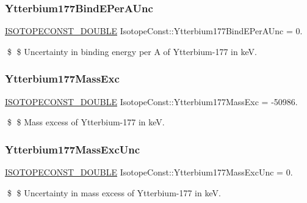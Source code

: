 \subsubsection{\texorpdfstring{Ytterbium177\+Bind\+E\+Per\+A\+Unc}{Ytterbium177BindEPerAUnc}}
{\footnotesize\ttfamily \mbox{\hyperlink{group___isotope_const-_macros_ga8f45a7272ce02c0b4c65c44636ed719a}{I\+S\+O\+T\+O\+P\+E\+C\+O\+N\+S\+T\+\_\+\+D\+O\+U\+B\+LE}} Isotope\+Const\+::\+Ytterbium177\+Bind\+E\+Per\+A\+Unc = 0.}

\$ \$ Uncertainty in binding energy per A of Ytterbium-\/177 in keV. \mbox{\label{group___isotope_const-_ytterbium-_yb177_ga6a1136306d6475c893e20b23e90b9ba8}} 
\subsubsection{\texorpdfstring{Ytterbium177\+Mass\+Exc}{Ytterbium177MassExc}}
{\footnotesize\ttfamily \mbox{\hyperlink{group___isotope_const-_macros_ga8f45a7272ce02c0b4c65c44636ed719a}{I\+S\+O\+T\+O\+P\+E\+C\+O\+N\+S\+T\+\_\+\+D\+O\+U\+B\+LE}} Isotope\+Const\+::\+Ytterbium177\+Mass\+Exc = -\/50986.}

\$ \$ Mass excess of Ytterbium-\/177 in keV. \mbox{\label{group___isotope_const-_ytterbium-_yb177_gaed6ceb0d0d1f862b0f3e260b2764f9fb}} 
\subsubsection{\texorpdfstring{Ytterbium177\+Mass\+Exc\+Unc}{Ytterbium177MassExcUnc}}
{\footnotesize\ttfamily \mbox{\hyperlink{group___isotope_const-_macros_ga8f45a7272ce02c0b4c65c44636ed719a}{I\+S\+O\+T\+O\+P\+E\+C\+O\+N\+S\+T\+\_\+\+D\+O\+U\+B\+LE}} Isotope\+Const\+::\+Ytterbium177\+Mass\+Exc\+Unc = 0.}

\$ \$ Uncertainty in mass excess of Ytterbium-\/177 in keV. \mbox{\label{group___isotope_const-_ytterbium-_yb177_ga5d1461bc3473c8331d6e579e5a634025}} 
